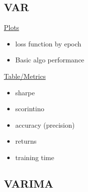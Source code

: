 \documentclass{article}
\begin{document}
\begin{figure}[H]
\begin{floatrow}
\end{floatrow}
\end{figure}



\subsection{VAR}

\underline{Plots}
\begin{itemize}
\item loss function by epoch
\item Basic algo performance 
\end{itemize}

\underline{Table/Metrics}
\begin{itemize}
\item sharpe
\item scorintino
\item accuracy (precision)
\item returns
\item training time
\end{itemize}

\subsection{VARIMA}



\end{document}
